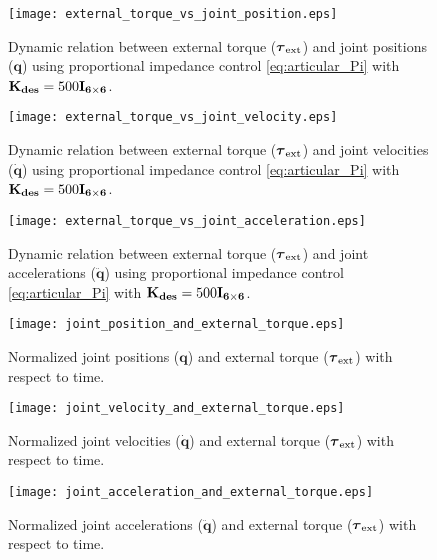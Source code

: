 \begin{figure}
\centering
\texttt{[image: external\_torque\_vs\_joint\_position.eps]}
\caption{Dynamic relation between external torque ($\boldsymbol{\tau}_\mathrm{ext}$) and joint positions ($\mathbf{q}$) using proportional impedance control \eqref{eq:articular_Pi} with $\mathbf{K_{des}}=500\mathbf{I_{6 \times 6}}$.}
\label{fig:act1.1.1_tau_vs_q}
\end{figure}

\begin{figure}
\centering
\texttt{[image: external\_torque\_vs\_joint\_velocity.eps]}
\caption{Dynamic relation between external torque ($\boldsymbol{\tau}_\mathrm{ext}$) and joint velocities ($\mathbf{\dot{q}}$) using proportional impedance control \eqref{eq:articular_Pi} with $\mathbf{K_{des}}=500\mathbf{I_{6 \times 6}}$.}
\label{fig:act1.1.1_tau_vs_dq}
\end{figure}

\begin{figure}
\centering
\texttt{[image: external\_torque\_vs\_joint\_acceleration.eps]}
\caption{Dynamic relation between external torque ($\boldsymbol{\tau}_\mathrm{ext}$) and joint accelerations ($\mathbf{\ddot{q}}$) using proportional impedance control \eqref{eq:articular_Pi} with $\mathbf{K_{des}}=500\mathbf{I_{6 \times 6}}$.}
\label{fig:act1.1.1_tau_vs_ddq}
\end{figure}

\begin{figure}
\centering
\texttt{[image: joint\_position\_and\_external\_torque.eps]}
\caption{Normalized joint positions ($\mathbf{q}$) and external torque ($\boldsymbol{\tau}_\mathrm{ext}$) with respect to time.}
\label{fig:act1.1.1_tau_and_q}
\end{figure}

\begin{figure}
\centering
\texttt{[image: joint\_velocity\_and\_external\_torque.eps]}
\caption{Normalized joint velocities ($\mathbf{\dot{q}}$) and external torque ($\boldsymbol{\tau}_\mathrm{ext}$) with respect to time.}
\label{fig:act1.1.1_tau_and_dq}
\end{figure}

\begin{figure}
\centering
\texttt{[image: joint\_acceleration\_and\_external\_torque.eps]}
\caption{Normalized joint accelerations ($\mathbf{\ddot{q}}$) and external torque ($\boldsymbol{\tau}_\mathrm{ext}$) with respect to time.}
\label{fig:act1.1.1_tau_and_ddq}
\end{figure}

